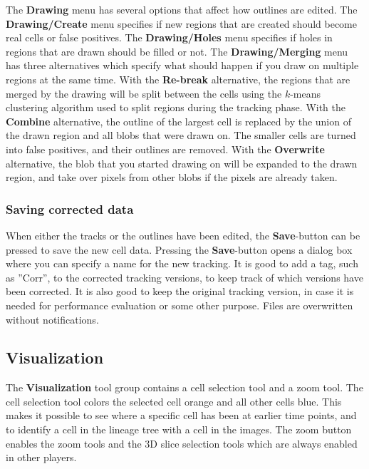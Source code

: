 \documentclass[a4paper, oneside, onecolumn, 11pt]{article}
\newcommand{\menu}[1]{\textbf{#1}}
\newcommand{\setting}[1]{''#1''}
\newcommand{\control}[1]{\textbf{#1}}
\begin{document}
The \menu{Drawing} menu has several options that affect how outlines are edited. The \menu{Drawing/\allowbreak Create} menu specifies if new regions that are created should become real cells or false positives. The \menu{Drawing/\allowbreak Holes} menu specifies if holes in regions that are drawn should be filled or not. The \menu{Drawing/\allowbreak Merging} menu has three alternatives which specify what should happen if you draw on multiple regions at the same time. With the \menu{Re-break} alternative, the regions that are merged by the drawing will be split between the cells using the $k$-means clustering algorithm used to split regions during the tracking phase. With the \menu{Combine} alternative, the outline of the largest cell is replaced by the union of the drawn region and all blobs that were drawn on. The smaller cells are turned into false positives, and their outlines are removed. With the \menu{Overwrite} alternative, the blob that you started drawing on will be expanded to the drawn region, and take over pixels from other blobs if the pixels are already taken.

\subsubsection{Saving corrected data}
\label{sec:saving-corrected-data}
When either the tracks or the outlines have been edited, the \control{Save}-button can be pressed to save the new cell data. Pressing the \control{Save}-button opens a dialog box where you can specify a name for the new tracking. It is good to add a tag, such as \setting{Corr}, to the corrected tracking versions, to keep track of which versions have been corrected. It is also good to keep the original tracking version, in case it is needed for performance evaluation or some other purpose. Files are overwritten without notifications.

\subsection{Visualization}
\label{sec:visualization}
The \control{Visualization} tool group contains a cell selection tool and a zoom tool. The cell selection tool colors the selected cell orange and all other cells blue. This makes it possible to see where a specific cell has been at earlier time points, and to identify a cell in the lineage tree with a cell in the images. The zoom button enables the zoom tools and the 3D slice selection tools which are always enabled in other players.
\end{document}
